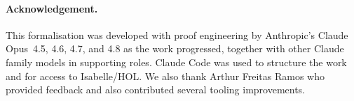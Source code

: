 \paragraph*{Acknowledgement.}
This formalisation was developed with proof engineering by
Anthropic's Claude Opus~4.5, 4.6, 4.7, and 4.8 as the work progressed,
together with other Claude family models in supporting roles.
Claude Code was used to structure the work and for access to Isabelle/HOL.
We also thank Arthur Freitas Ramos who provided feedback
and also contributed several tooling improvements.
\endinput
